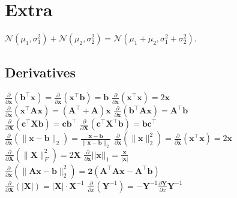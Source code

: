
\section*{Extra}
$\mathcal{N}(\mu_1,\sigma^2_1)+\mathcal{N}(\mu_2,\sigma^2_2)=\mathcal{N}(\mu_1+\mu_2,\sigma_1^2+\sigma_2^2)$.

\subsection*{Derivatives}
$\frac{\partial}{\partial \mathbf{x}}(\mathbf{b}^\top \mathbf{x}) = \frac{\partial}{\partial \mathbf{x}}(\mathbf{x}^\top \mathbf{b}) = \mathbf{b}$ \quad
$\frac{\partial}{\partial \mathbf{x}}(\mathbf{x}^\top \mathbf{x}) = 2\mathbf{x}$\\
$\frac{\partial}{\partial \mathbf{x}}(\mathbf{x}^\top \mathbf{A}\mathbf{x}) = (\mathbf{A}^\top + \mathbf{A})\mathbf{x}$ \quad
$\frac{\partial}{\partial \mathbf{x}}(\mathbf{b}^\top \mathbf{A}\mathbf{x}) = \mathbf{A}^\top \mathbf{b}$\\
$\frac{\partial}{\partial \mathbf{X}}(\mathbf{c}^\top \mathbf{X} \mathbf{b}) = \mathbf{c}\mathbf{b}^\top$ \quad
$\frac{\partial}{\partial \mathbf{X}}(\mathbf{c}^\top \mathbf{X}^\top \mathbf{b}) = \mathbf{b}\mathbf{c}^\top$\\
$\frac{\partial}{\partial \mathbf{x}}(\| \mathbf{x}-\mathbf{b} \|_2) = \frac{\mathbf{x}-\mathbf{b}}{\|\mathbf{x}-\mathbf{b}\|_2}$ \quad
$\frac{\partial}{\partial \mathbf{x}}(\|\mathbf{x}\|^2_2) = \frac{\partial}{\partial \mathbf{x}} (\mathbf{x}^\top \mathbf{x}) = 2\mathbf{x}$\\
$\frac{\partial}{\partial \mathbf{X}}(\|\mathbf{X}\|_F^2) = 2\mathbf{X}$  \quad $\frac{\partial}{\partial \mathbf{x}}||\mathbf{x}||_1 = \frac{\mathbf{x}}{|\mathbf{x}|}$\\
$\frac{\partial}{\partial \mathbf{x}}(\|\mathbf{Ax - b}\|_2^2) = \mathbf{2(A^\top Ax-A^\top b)}$ \\
$\frac{\partial}{\partial \mathbf{X}}(|\mathbf{X}|) = |\mathbf{X}|\cdot \mathbf{X}^{-1}$ \quad $\frac{\partial}{\partial x}(\mathbf{Y}^{-1}) = -\mathbf{Y}^{-1} \frac{\partial\mathbf{Y}}{\partial x} \mathbf{Y}^{-1}$
